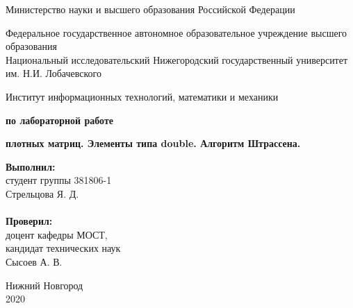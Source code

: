 \documentclass{report}
\begin{document}
\begin{titlepage}

\begin{center}
Министерство науки и высшего образования Российской Федерации
\end{center}

\begin{center}
Федеральное государственное автономное образовательное учреждение высшего образования \\
Национальный исследовательский Нижегородский государственный университет им. Н.И. Лобачевского
\end{center}

\begin{center}
Институт информационных технологий, математики и механики
\end{center}

\vspace{4em}

\begin{center}
\textbf{ по лабораторной работе} \\
\end{center}
\begin{center}
\textbf{ плотных матриц. Элементы типа double. Алгоритм Штрассена.} \\
\end{center}

\vspace{4em}

\newbox{\lbox}
\newlength{\maxl}
\setlength{\maxl}{\wd\lbox}
\hfill\parbox{7cm}{
\hspace*{5cm}\hspace*{-5cm}\textbf{Выполнил:} \\ студент группы 381806-1 \\ Стрельцова Я. Д.\\
\hspace*{5cm} \\
\hspace*{5cm}\hspace*{-5cm}\textbf{Проверил:}\\ доцент кафедры МОСТ, \\ кандидат технических наук \\ Сысоев А. В.
}
\vspace{\fill}

\begin{center} Нижний Новгород \\ 2020 \end{center}

\end{titlepage}
\end{document}
